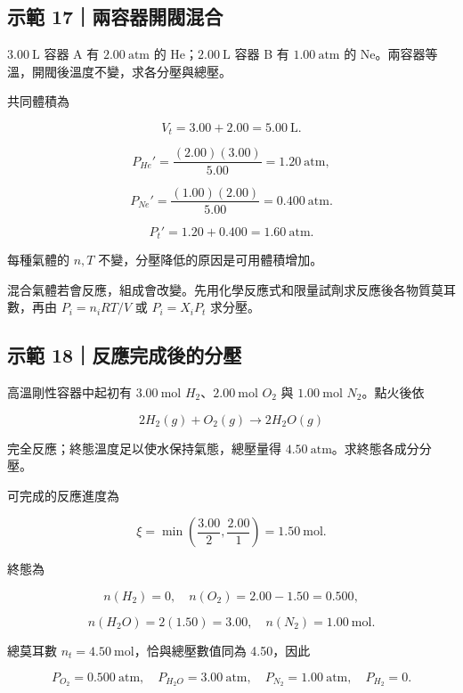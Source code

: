 \documentclass[11pt,a4paper]{article}
\begin{document}
\begin{HandoutWorkedExample}

\subsection{示範 17｜兩容器開閥混合}\label{ux793aux7bc4-17ux5169ux5bb9ux5668ux958bux95a5ux6df7ux5408}

\(3.00\ \mathrm L\) 容器 A 有 \(2.00\ \mathrm{atm}\) 的 He；\(2.00\ \mathrm L\) 容器 B 有 \(1.00\ \mathrm{atm}\) 的 Ne。兩容器等溫，開閥後溫度不變，求各分壓與總壓。

共同體積為

\[
V_t=3.00+2.00=5.00\ \mathrm L.
\]

\[
P_{He}'=\frac{(2.00)(3.00)}{5.00}=1.20\ \mathrm{atm},
\]

\[
P_{Ne}'=\frac{(1.00)(2.00)}{5.00}=0.400\ \mathrm{atm}.
\]

\[
P_t'=1.20+0.400=1.60\ \mathrm{atm}.
\]

每種氣體的 \(n,T\) 不變，分壓降低的原因是可用體積增加。

\end{HandoutWorkedExample}

混合氣體若會反應，組成會改變。先用化學反應式和限量試劑求反應後各物質莫耳數，再由 \(P_i=n_iRT/V\) 或 \(P_i=X_iP_t\) 求分壓。

\begin{HandoutWorkedExample}

\subsection{示範 18｜反應完成後的分壓}\label{ux793aux7bc4-18ux53cdux61c9ux5b8cux6210ux5f8cux7684ux5206ux58d3}

高溫剛性容器中起初有 \(3.00\ \mathrm{mol}\) \(H_2\)、\(2.00\ \mathrm{mol}\) \(O_2\) 與 \(1.00\ \mathrm{mol}\) \(N_2\)。點火後依

\[
2H_2(g)+O_2(g)\rightarrow2H_2O(g)
\]

完全反應；終態溫度足以使水保持氣態，總壓量得 \(4.50\ \mathrm{atm}\)。求終態各成分分壓。

可完成的反應進度為

\[
\xi=\min\left(\frac{3.00}{2},\frac{2.00}{1}\right)=1.50\ \mathrm{mol}.
\]

終態為

\[
n(H_2)=0,\quad n(O_2)=2.00-1.50=0.500,
\]

\[
n(H_2O)=2(1.50)=3.00,\quad n(N_2)=1.00\ \mathrm{mol}.
\]

總莫耳數 \(n_t=4.50\ \mathrm{mol}\)，恰與總壓數值同為 4.50，因此

\[
P_{O_2}=0.500\ \mathrm{atm},\quad
P_{H_2O}=3.00\ \mathrm{atm},\quad
P_{N_2}=1.00\ \mathrm{atm},\quad P_{H_2}=0.
\]

\end{HandoutWorkedExample}
\end{document}
